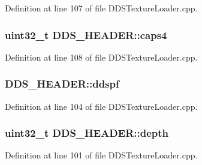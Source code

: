 Definition at line 107 of file D\+D\+S\+Texture\+Loader.\+cpp.

\subsubsection[{\texorpdfstring{caps4}{caps4}}]{\setlength{\rightskip}{0pt plus 5cm}uint32\+\_\+t D\+D\+S\+\_\+\+H\+E\+A\+D\+E\+R\+::caps4}\hypertarget{struct_d_d_s___h_e_a_d_e_r_a82a00dd554e8212cb5a002b1970b225c_a82a00dd554e8212cb5a002b1970b225c}{}\label{struct_d_d_s___h_e_a_d_e_r_a82a00dd554e8212cb5a002b1970b225c_a82a00dd554e8212cb5a002b1970b225c}


Definition at line 108 of file D\+D\+S\+Texture\+Loader.\+cpp.

\subsubsection[{\texorpdfstring{ddspf}{ddspf}}]{ D\+D\+S\+\_\+\+H\+E\+A\+D\+E\+R\+::ddspf}\hypertarget{struct_d_d_s___h_e_a_d_e_r_a27445ea81444c05a620469f266bff154_a27445ea81444c05a620469f266bff154}{}\label{struct_d_d_s___h_e_a_d_e_r_a27445ea81444c05a620469f266bff154_a27445ea81444c05a620469f266bff154}


Definition at line 104 of file D\+D\+S\+Texture\+Loader.\+cpp.

\subsubsection[{\texorpdfstring{depth}{depth}}]{\setlength{\rightskip}{0pt plus 5cm}uint32\+\_\+t D\+D\+S\+\_\+\+H\+E\+A\+D\+E\+R\+::depth}\hypertarget{struct_d_d_s___h_e_a_d_e_r_aa5b6801b932296cdfdc1651310c00c9b_aa5b6801b932296cdfdc1651310c00c9b}{}\label{struct_d_d_s___h_e_a_d_e_r_aa5b6801b932296cdfdc1651310c00c9b_aa5b6801b932296cdfdc1651310c00c9b}


Definition at line 101 of file D\+D\+S\+Texture\+Loader.\+cpp.

